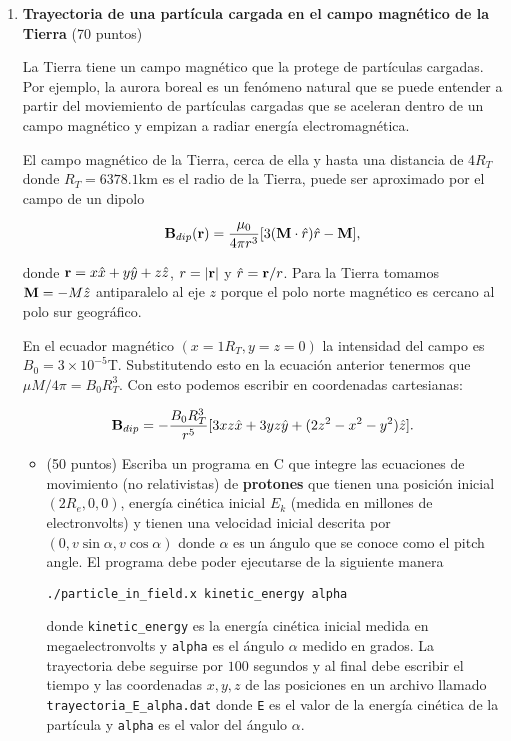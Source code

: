 \documentclass{article}
\begin{document}
\begin{enumerate}
\item {\bf Trayectoria de una part\'icula cargada en el campo
  magn\'etico de la Tierra} (70 puntos)  

La Tierra tiene un campo magn\'etico que la protege de part\'iculas
cargadas. Por ejemplo, la aurora boreal es un fen\'omeno natural que se puede
entender a partir del moviemiento de part\'iculas cargadas que se
aceleran dentro de un campo magn\'etico y empizan a radiar energ\'ia
electromagn\'etica.  

El campo magn\'etico de la Tierra, cerca de ella y hasta una distancia
de 4$R_{T}$ donde $R_T=6378.1$km es el radio de  la Tierra, puede ser
aproximado por el campo de un dipolo 

\begin{equation}
{\bf B}_{dip}({\bf r}) = \frac{\mu_0}{4\pi r^3}[3({\bf M}\cdot{\hat{
    r}})\hat{r}-{\bf M}], 
\end{equation}

donde ${\bf r}=x\hat{x} + y\hat{y} + z\hat{z}$, $r=|{\bf r}|$ y
$\hat{r}={\bf r}/r$. Para la Tierra tomamos ${\bf M}=-M\hat{z}$
  antiparalelo al eje $z$ porque el polo norte magn\'etico es cercano
  al polo sur geogr\'afico. 

En el ecuador magn\'etico $(x=1R_T,y=z=0)$ la intensidad del campo es
$B_0=3\times 10^{-5}$T. Substitutendo esto en la ecuaci\'on anterior
tenermos que $\mu M/4\pi=B_0R_T^3$. Con esto podemos escribir en
coordenadas cartesianas:

\begin{equation}
{\bf B}_{dip} = -\frac{B_0 R_T^3}{r^5}[3xz\hat{x} + 3yz\hat{y} + (2z^2
  - x^2 -y^2)\hat{z}].
\end{equation}

\begin{itemize}

\item (50 puntos) Escriba un programa en C que integre las ecuaciones
  de movimiento (no relativistas) de {\bf protones} que tienen una
  posici\'on inicial $(2R_e,0,0)$, energ\'ia cin\'etica inicial
  $E_{k}$ (medida en millones de electronvolts) y tienen una velocidad
  inicial descrita por $(0,v\sin\alpha, v\cos\alpha)$ donde $\alpha$
  es un \'angulo que se conoce como el pitch angle. El programa debe
  poder ejecutarse de la siguiente manera 
\begin{verbatim}
./particle_in_field.x kinetic_energy alpha
\end{verbatim}
donde \verb"kinetic_energy" es la energ\'ia cin\'etica inicial medida
en megaelectronvolts y \verb"alpha" es el \'angulo $\alpha$ medido en
grados. La trayectoria debe seguirse por $100$ segundos y al final
debe escribir el tiempo y las coordenadas $x,y,z$ de las posiciones en un archivo
llamado \verb"trayectoria_E_alpha.dat" donde \verb"E" es el valor de la
energ\'ia cin\'etica de la part\'icula y \verb"alpha" es el valor del
\'angulo $\alpha$.


\end{itemize}
\end{enumerate}
\end{document}
